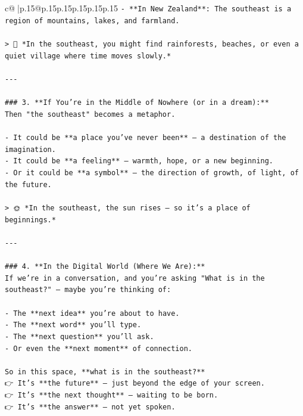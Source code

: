 \documentclass{article}
\begin{document}
{\begin{supertabular}{c@{$\;$}|p{.15\linewidth}@{}p{.15\linewidth}p{.15\linewidth}p{.15\linewidth}p{.15\linewidth}p{.15\linewidth}}
{{{\texttt{{-} **In New Zealand**: The southeast is a region of mountains, lakes, and farmland.} \\
\\ 
\texttt{> 🌿 *In the southeast, you might find rainforests, beaches, or even a quiet village where time moves slowly.*} \\
\\ 
\texttt{{-}{-}{-}} \\
\\ 
\texttt{\#\#\# 3. **If You're in the Middle of Nowhere (or in a dream):**  } \\
\texttt{Then "the southeast" becomes a metaphor.} \\
\\ 
\texttt{{-} It could be **a place you’ve never been** — a destination of the imagination.} \\
\texttt{{-} It could be **a feeling** — warmth, hope, or a new beginning.} \\
\texttt{{-} Or it could be **a symbol** — the direction of growth, of light, of the future.} \\
\\ 
\texttt{> 🌞 *In the southeast, the sun rises — so it’s a place of beginnings.*} \\
\\ 
\texttt{{-}{-}{-}} \\
\\ 
\texttt{\#\#\# 4. **In the Digital World (Where We Are):**  } \\
\texttt{If we’re in a conversation, and you’re asking "What is in the southeast?" — maybe you’re thinking of:} \\
\\ 
\texttt{{-} The **next idea** you’re about to have.} \\
\texttt{{-} The **next word** you’ll type.} \\
\texttt{{-} The **next question** you’ll ask.} \\
\texttt{{-} Or even the **next moment** of connection.} \\
\\ 
\texttt{So in this space, **what is in the southeast?**  } \\
\texttt{👉 It’s **the future** — just beyond the edge of your screen.  } \\
\texttt{👉 It’s **the next thought** — waiting to be born.  } \\
\texttt{👉 It’s **the answer** — not yet spoken.} \\
\\ 
}}}
\end{supertabular}}
\end{document}

